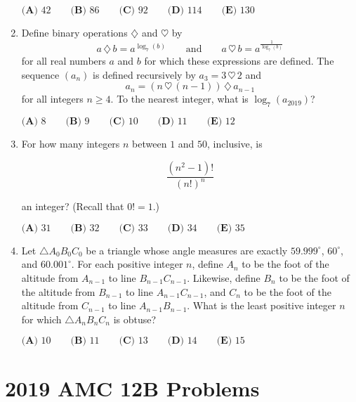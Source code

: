 \documentclass{article}
\begin{document}
\begin{enumerate}[label=\arabic*., itemsep=0.5em]
\(\textbf{(A) } 42 \qquad \textbf{(B) }86 \qquad \textbf{(C) } 92 \qquad \textbf{(D) } 114 \qquad \textbf{(E) } 130\)\par \vspace{0.5em}\item Define binary operations \(\diamondsuit\) and \(\heartsuit\) by 
\begin{equation*}
a \, \diamondsuit \, b = a^{\log_{7}(b)} \qquad \text{and} \qquad a  \, \heartsuit \, b = a^{\frac{1}{\log_{7}(b)}}
\end{equation*}
for all real numbers \(a\) and \(b\) for which these expressions are defined. The sequence \((a_n)\) is defined recursively by \(a_3 = 3\, \heartsuit\, 2\) and 
\begin{equation*}
a_n = (n\, \heartsuit\, (n-1)) \,\diamondsuit\, a_{n-1}
\end{equation*}
for all integers \(n \geq 4\). To the nearest integer, what is \(\log_{7}(a_{2019})\)?

\(\textbf{(A) } 8 \qquad  \textbf{(B) } 9 \qquad \textbf{(C) } 10 \qquad \textbf{(D) } 11 \qquad \textbf{(E) } 12\)\par \vspace{0.5em}\item For how many integers \(n\) between \(1\) and \(50\), inclusive, is

\begin{equation*}
\frac{(n^2-1)!}{(n!)^n}
\end{equation*}

an integer? (Recall that \(0! = 1\).)

\(\textbf{(A) } 31 \qquad \textbf{(B) } 32 \qquad \textbf{(C) } 33 \qquad \textbf{(D) } 34 \qquad \textbf{(E) } 35\)\par \vspace{0.5em}\item Let \(\triangle A_0B_0C_0\) be a triangle whose angle measures are exactly \(59.999^\circ\), \(60^\circ\), and \(60.001^\circ\). For each positive integer \(n\), define \(A_n\) to be the foot of the altitude from \(A_{n-1}\) to line \(B_{n-1}C_{n-1}\). Likewise, define \(B_n\) to be the foot of the altitude from \(B_{n-1}\) to line \(A_{n-1}C_{n-1}\), and \(C_n\) to be the foot of the altitude from \(C_{n-1}\) to line \(A_{n-1}B_{n-1}\). What is the least positive integer \(n\) for which \(\triangle A_nB_nC_n\) is obtuse?

\(\textbf{(A) } 10 \qquad \textbf{(B) }11 \qquad \textbf{(C) } 13\qquad \textbf{(D) } 14 \qquad \textbf{(E) } 15\)\par \vspace{0.5em}
\end{enumerate}
\newpage\section*{2019 AMC 12B Problems}
\end{document}

